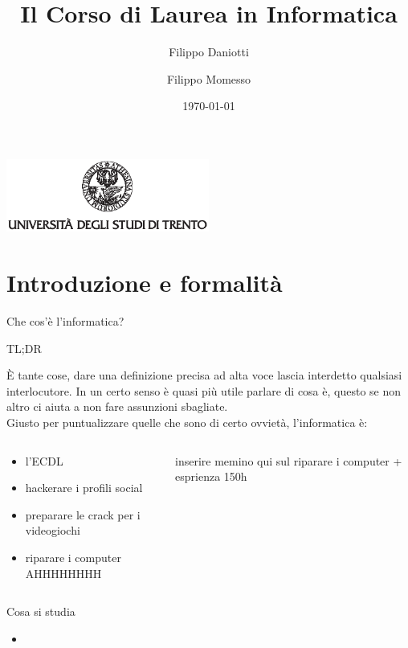 \documentclass[aspectratio=1610]{beamer}
\title{Il Corso di Laurea in Informatica}
\author{Filippo Daniotti \and Filippo Momesso}
\date{\today}
\institute[DISI]{Dipartimento di Ingegneria e Scienza dell'Informazione}
\begin{document}
	\begin{frame}[plain]
		\centering
		\includegraphics[width=0.5\textwidth, keepaspectratio]{logo-unitn.eps}		
		\titlepage
	\end{frame}

	\section{Introduzione e formalità}
	\begin{frame}[fragile]{Che cos'è l'informatica?}
		\begin{center}
			\Large{TL;DR}\\
		\end{center}		
		È tante cose, dare una definizione precisa ad alta voce lascia interdetto qualsiasi interlocutore. In un certo senso è quasi più utile parlare di cosa  è, questo se non altro ci aiuta a non fare assunzioni sbagliate.\\
		\bigskip
		\pause
		Giusto per puntualizzare quelle che sono di certo ovvietà, l'informatica  è:
		\begin{columns}
			\begin{column}{0.55\textwidth}
				\begin{itemize}
					\item l'ECDL 
					\item hackerare i profili social 
					\item preparare le crack per i videogiochi 
					\item riparare i computer \Large{AHHHHHHHH} 
				\end{itemize}		
			\end{column}
			\begin{column}{0.4\textwidth}
				inserire memino qui sul riparare i computer + esprienza 150h
			\end{column}
		\end{columns}
	\end{frame}

	\begin{frame}{Cosa si studia}
		\begin{itemize}
			\item 
		\end{itemize}
	\end{frame}
\end{document}

